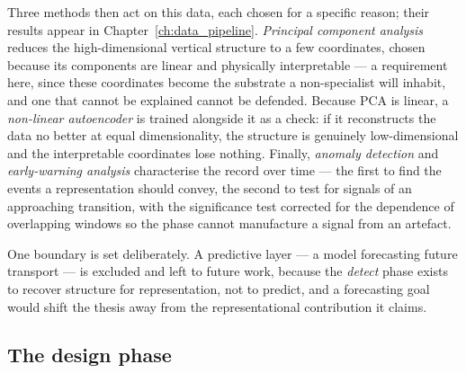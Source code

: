 Three methods then act on this data, each chosen for a specific reason; their results appear in Chapter~\ref{ch:data_pipeline}. \emph{Principal component analysis} reduces the high-dimensional vertical structure to a few coordinates, chosen because its components are linear and physically interpretable --- a requirement here, since these coordinates become the substrate a non-specialist will inhabit, and one that cannot be explained cannot be defended. Because PCA is linear, a \emph{non-linear autoencoder} is trained alongside it as a check: if it reconstructs the data no better at equal dimensionality, the structure is genuinely low-dimensional and the interpretable coordinates lose nothing. Finally, \emph{anomaly detection} and \emph{early-warning analysis} characterise the record over time --- the first to find the events a representation should convey, the second to test for signals of an approaching transition, with the significance test corrected for the dependence of overlapping windows so the phase cannot manufacture a signal from an artefact.

One boundary is set deliberately. A predictive layer --- a model forecasting future transport --- is excluded and left to future work, because the \emph{detect} phase exists to recover structure for representation, not to predict, and a forecasting goal would shift the thesis away from the representational contribution it claims.

\subsection{The design phase}
\label{subsec:design}

